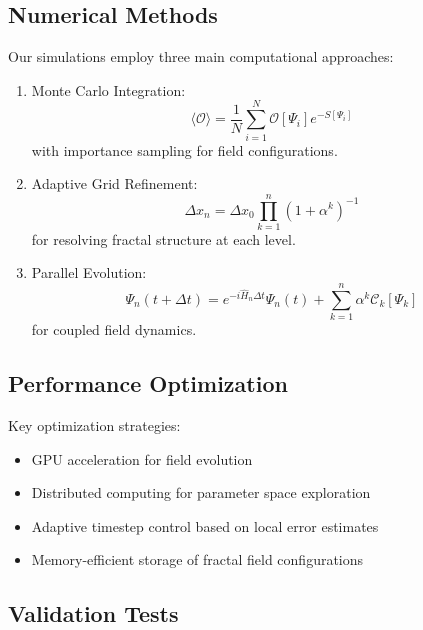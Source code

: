 \documentclass{article}
\begin{document}
\subsection{Numerical Methods}

Our simulations employ three main computational approaches:

\begin{enumerate}
\item Monte Carlo Integration:
   \begin{equation}
   \langle\mathcal{O}\rangle = \frac{1}{N}\sum_{i=1}^N \mathcal{O}[\Psi_i] e^{-S[\Psi_i]}
   \end{equation}
   with importance sampling for field configurations.

\item Adaptive Grid Refinement:
   \begin{equation}
   \Delta x_n = \Delta x_0 \prod_{k=1}^n (1 + \alpha^k)^{-1}
   \end{equation}
   for resolving fractal structure at each level.

\item Parallel Evolution:
   \begin{equation}
   \Psi_n(t + \Delta t) = e^{-i\hat{H}_n\Delta t}\Psi_n(t) + \sum_{k=1}^n \alpha^k \mathcal{C}_k[\Psi_k]
   \end{equation}
   for coupled field dynamics.
\end{enumerate}

\subsection{Performance Optimization}

Key optimization strategies:

\begin{itemize}
\item GPU acceleration for field evolution
\item Distributed computing for parameter space exploration
\item Adaptive timestep control based on local error estimates
\item Memory-efficient storage of fractal field configurations
\end{itemize}

\subsection{Validation Tests}
\end{document}
